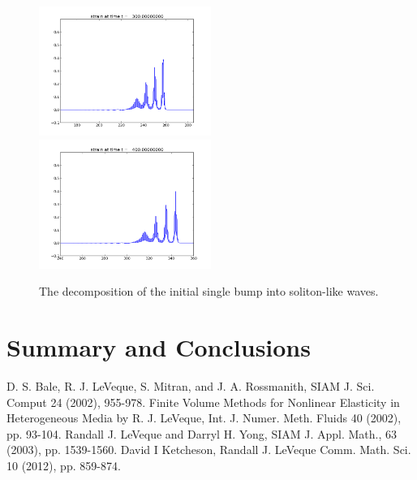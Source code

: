 \documentclass{article}
\begin{document}
\begin{figure}
  \includegraphics[width=0.5\textwidth]{frame0030fig1.png}
  \includegraphics[width=0.5\textwidth]{frame0040fig1.png}
  \caption{The decomposition of the initial single bump into soliton-like waves.}
  \label{travelw}
\end{figure}


\section{Summary and Conclusions}




\begin{thebibliography}{9}
D. S. Bale, R. J. LeVeque, S. Mitran, and J. A. Rossmanith, SIAM J. Sci. Comput 24 (2002), 955-978.
Finite Volume Methods for Nonlinear Elasticity in Heterogeneous Media
by R. J. LeVeque, Int. J. Numer. Meth. Fluids 40 (2002), pp. 93-104.
Randall J. LeVeque and Darryl H. Yong, SIAM J. Appl. Math., 63 (2003), pp. 1539-1560.
David I Ketcheson, Randall J. LeVeque Comm. Math. Sci. 10 (2012), pp. 859-874.

\end{thebibliography}
\end{document}
